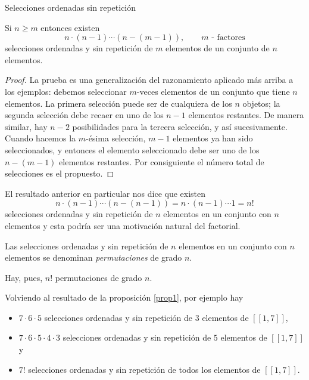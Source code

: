 \begin{section}{Selecciones ordenadas sin repetición}
\begin{proposicion}\label{prop1}
Si $n \ge m$ entonces existen
\begin{equation}\label{ordsinrep}
 n \cdot (n - 1) \cdots (n - (m - 1)), \qquad \text{$m$ - factores}
\end{equation}
selecciones ordenadas y sin repetición de $m$ elementos de un conjunto de $n$ elementos.
\end{proposicion}
\begin{proof} La prueba es una generalización del razonamiento aplicado más arriba a los e\-jem\-plos: debemos seleccionar $m$-veces elementos de un conjunto que tiene $n$ elementos. La primera selección puede ser de cualquiera de los $n$ objetos; la segunda selección debe recaer en uno de los $n-1$ elementos restantes. De manera similar, hay $n-2$ posibilidades para la tercera selección, y así sucesivamente. Cuando hacemos la $m$-ésima selección, $m-1$ elementos ya han sido seleccionados, y entonces el elemento seleccionado debe ser uno de los $n-(m-1)$ elementos restantes. Por consiguiente el número total de
selecciones es el propuesto. 
\end{proof}

\begin{observacion}
El resultado anterior en particular nos dice que existen
$$
n \cdot (n - 1) \cdots (n - (n - 1)) = n \cdot (n - 1) \cdots 1 = n!
$$
selecciones ordenadas y sin repetición de  $n$ elementos en un conjunto con $n$ elementos y esta podría ser una motivación natural del factorial.


Las selecciones ordenadas y sin repetición de  $n$ elementos en un conjunto con $n$ elementos se denominan {\em permutaciones} de grado $n$.

Hay, pues, $n!$ permutaciones de grado $n$.
\end{observacion}

Volviendo al resultado de la proposición \ref{prop1}, por ejemplo hay 
\begin{itemize}
\item $7 \cdot 6 \cdot 5$ selecciones ordenadas y sin repetición de $3$ elementos de  $[[1,7]]$,
\item $7 \cdot 6 \cdot 5 \cdot 4 \cdot 3$  selecciones ordenadas y sin repetición de $5$ elementos de $[[1,7]]$ y
\item $7!$  selecciones ordenadas y sin repetición de todos los elementos de $[[1,7]]$.
\end{itemize}


\end{section}
